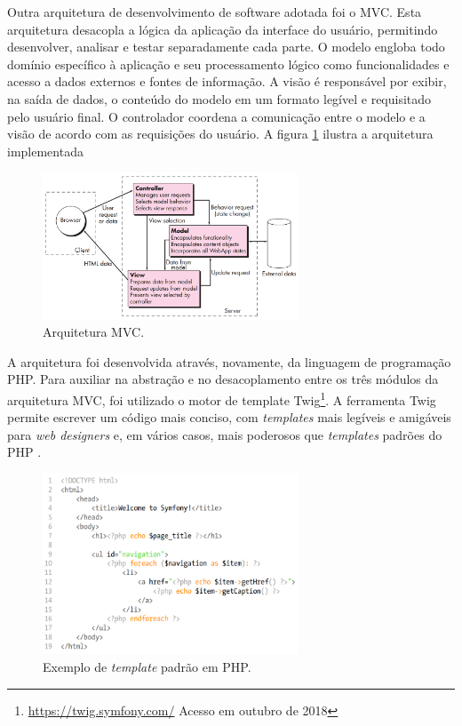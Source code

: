 \documentclass[cic,tc]{iiufrgs}
\begin{document}
Outra arquitetura de desenvolvimento de software adotada foi o MVC. Esta arquitetura desacopla a lógica da aplicação da interface do usuário, permitindo desenvolver, analisar e testar separadamente cada parte. O modelo engloba todo domínio específico à aplicação e seu processamento lógico como funcionalidades e acesso a dados externos e fontes de informação. A visão é responsável por exibir, na saída de dados, o conteúdo do modelo em um formato legível e requisitado pelo usuário final. O controlador coordena a comunicação entre o modelo e a visão de acordo com as requisições do usuário. A figura \ref{dataMVCArchitecture} ilustra a arquitetura implementada

\begin{figure}[ht]
    \caption{Arquitetura MVC.}
       	\begin{center}
            \includegraphics[width=0.68\textwidth]{arquitetura-mvc.png}
        \end{center}
    \label{dataMVCArchitecture}
\end{figure}

A arquitetura foi desenvolvida através, novamente, da linguagem de programação PHP. Para auxiliar na abstração e no desacoplamento entre os três módulos da arquitetura MVC, foi utilizado o motor de template Twig\footnote{\url{https://twig.symfony.com/} Acesso em outubro de 2018}. A ferramenta Twig  permite escrever um código mais conciso, com \textit{templates} mais legíveis e amigáveis para \textit{web designers} e, em vários casos, mais poderosos que \textit{templates} padrões do PHP \cite{symfonyBook}.

\begin{figure}[ht]
    \caption{Exemplo de \textit{template} padrão em PHP.}
       	\begin{center}
            \includegraphics[width=0.68\textwidth]{twig-php.png}
        \end{center}
    \label{codeTemplatePHP}
\end{figure}
\end{document}
